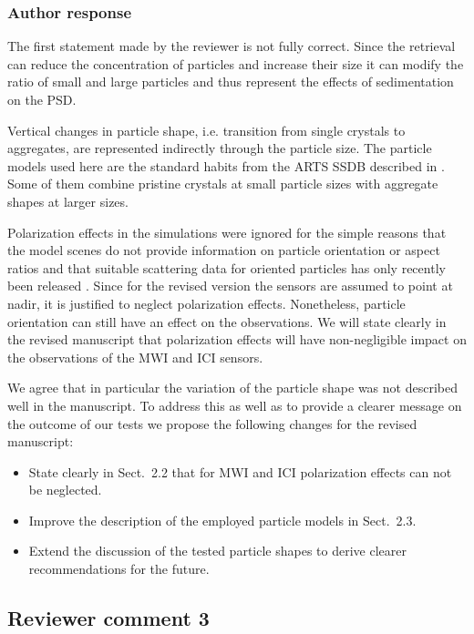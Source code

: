 \documentclass[11pt]{scrartcl}
\begin{document}
\subsubsection*{Author response}

The first statement made by the reviewer is not fully correct. Since the retrieval
can reduce the concentration of particles and increase their size it can modify
the ratio of small and large particles and thus represent the effects of sedimentation
on the PSD.

Vertical changes in particle shape, i.e. transition from single crystals to
aggregates, are represented indirectly through the particle size. The particle
models used here are the standard habits from the ARTS SSDB described in
\cite{eriksson18}. Some of them combine pristine crystals at small particle
sizes with aggregate shapes at larger sizes.

Polarization effects in the simulations were ignored for the simple reasons that
the model scenes do not provide information on particle orientation or aspect
ratios and that suitable scattering data for oriented particles has only
recently been released \citep{brath19}. Since for the revised version the
sensors are assumed to point at nadir, it is justified to neglect polarization
effects. Nonetheless, particle orientation can still have an effect on the
observations. We will state clearly in the revised manuscript that polarization
effects will have non-negligible impact on the observations of the MWI and ICI
sensors.

We agree that in particular the variation of the particle shape was not
described well in the manuscript. To address this as well as to provide a
clearer message on the outcome of our tests we propose the following changes for
the revised manuscript:

\begin{itemize}
\item State clearly in Sect.~2.2 that for MWI and ICI polarization effects can
  not be neglected.
\item Improve the description of the employed particle models in Sect.~2.3.
\item Extend the discussion of the tested particle shapes to derive clearer
  recommendations for the future.
\end{itemize}

\subsection*{Reviewer comment 3}
\end{document}
